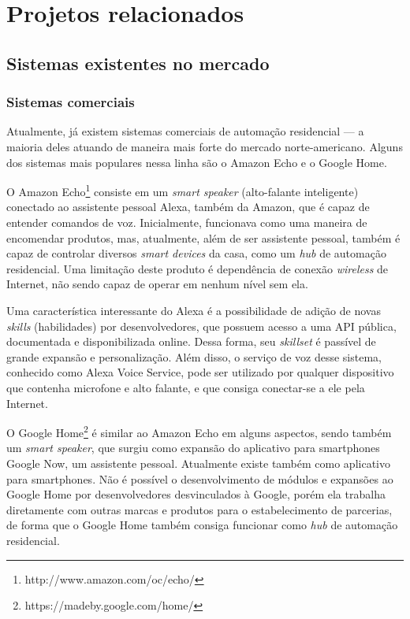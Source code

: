 \chapter{Projetos relacionados}

\section{Sistemas existentes no mercado}

\subsection{Sistemas comerciais}
Atualmente, já existem sistemas comerciais de automação residencial --- a maioria deles atuando de maneira mais forte do mercado norte-americano. Alguns dos sistemas mais populares nessa linha são o Amazon Echo e o Google Home.

O Amazon Echo\footnote{http://www.amazon.com/oc/echo/} consiste em um \textit{smart speaker} (alto-falante inteligente) conectado ao assistente pessoal Alexa, também da Amazon, que é capaz de entender comandos de voz. Inicialmente, funcionava como uma maneira de encomendar produtos, mas, atualmente, além de ser assistente pessoal, também é capaz de controlar diversos \textit{smart devices} da casa, como um \textit{hub} de automação residencial. Uma limitação deste produto é dependência de conexão \textit{wireless} de Internet, não sendo capaz de operar em nenhum nível sem ela.

Uma característica interessante do Alexa é a possibilidade de adição de novas \textit{skills} (habilidades) por desenvolvedores, que possuem acesso a uma API pública, documentada e disponibilizada online. Dessa forma, seu \textit{skillset} é passível de grande expansão e personalização. Além disso, o serviço de voz desse sistema, conhecido como Alexa Voice Service, pode ser utilizado por qualquer dispositivo que contenha microfone e alto falante, e que consiga conectar-se a ele pela Internet.

O Google Home\footnote{https://madeby.google.com/home/} é similar ao Amazon Echo em alguns aspectos, sendo também um \textit{smart speaker}, que surgiu como expansão do aplicativo para smartphones Google Now, um assistente pessoal. Atualmente existe também como aplicativo para smartphones. Não é possível o desenvolvimento de módulos e expansões ao Google Home por desenvolvedores desvinculados à Google, porém ela trabalha diretamente com outras marcas e produtos para o estabelecimento de parcerias, de forma que o Google Home também consiga funcionar como \textit{hub} de automação residencial.

